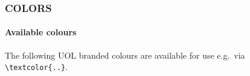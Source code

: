\documentclass[
aspectratio=169,
]{beamer}
\begin{document}
\begin{frame}[t,fragile]
    \frametitle{COLORS}
    \framesubtitle{Available colours}

    The following UOL branded colours are available
    for use e.g.\ via \verb|\textcolor{..}|.

    \medskip
    \begin{columns}[onlytextwidth]
        \begin{column}{0.25\textwidth}
        \end{column}
        \begin{column}{0.25\textwidth}
        \end{column}
        \begin{column}{0.25\textwidth}
        \end{column}
        \begin{column}{0.25\textwidth}
        \end{column}
    \end{columns}
\end{frame}
\end{document}
